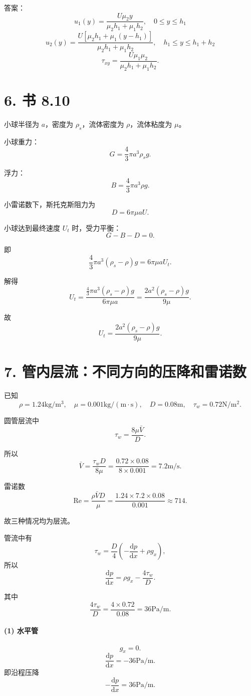 ﻿\documentclass[12pt,a4paper]{ctexart}
\newcommand{\Rey}{\mathrm{Re}}
\newcommand{\dd}{\mathrm d}
\begin{document}
答案：
\[
\boxed{
u_1(y)=
\frac{U\mu_2 y}{\mu_2h_1+\mu_1h_2},
\quad 0\le y\le h_1
}
\]
\[
\boxed{
u_2(y)=
\frac{U\left[\mu_2h_1+\mu_1(y-h_1)\right]}
{\mu_2h_1+\mu_1h_2},
\quad h_1\le y\le h_1+h_2
}
\]
\[
\boxed{
\tau_{xy}=
\frac{U\mu_1\mu_2}{\mu_2h_1+\mu_1h_2}
}.
\]

\section*{6. 书 8.10}

小球半径为 \(a\)，密度为 \(\rho_s\)，流体密度为 \(\rho\)，流体粘度为 \(\mu\)。

小球重力：
\[
G=\frac43\pi a^3\rho_s g.
\]

浮力：
\[
B=\frac43\pi a^3\rho g.
\]

小雷诺数下，斯托克斯阻力为
\[
D=6\pi\mu aU.
\]

小球达到最终速度 \(U_t\) 时，受力平衡：
\[
G-B-D=0.
\]

即
\[
\frac43\pi a^3(\rho_s-\rho)g
=6\pi\mu aU_t.
\]

解得
\[
U_t=
\frac{\frac43\pi a^3(\rho_s-\rho)g}{6\pi\mu a}
=
\frac{2a^2(\rho_s-\rho)g}{9\mu}.
\]

故
\[
\boxed{
U_t=\frac{2a^2(\rho_s-\rho)g}{9\mu}
}.
\]

\section*{7. 管内层流：不同方向的压降和雷诺数}

已知
\[
\rho=1.24\mathrm{kg/m^3},\quad
\mu=0.001\mathrm{kg/(m\cdot s)},\quad
D=0.08\mathrm m,\quad
\tau_w=0.72\mathrm{N/m^2}.
\]

圆管层流中
\[
\tau_w=\frac{8\mu \bar V}{D}.
\]

所以
\[
\bar V=\frac{\tau_wD}{8\mu}
=\frac{0.72\times0.08}{8\times0.001}
=7.2\mathrm{m/s}.
\]

雷诺数
\[
\Rey=\frac{\rho \bar VD}{\mu}
=\frac{1.24\times7.2\times0.08}{0.001}
\approx714.
\]

故三种情况均为层流。

管流中有
\[
\tau_w=\frac{D}{4}\left(-\frac{\dd p}{\dd x}+\rho g_x\right),
\]
所以
\[
\frac{\dd p}{\dd x}
=\rho g_x-\frac{4\tau_w}{D}.
\]

其中
\[
\frac{4\tau_w}{D}
=\frac{4\times0.72}{0.08}
=36\mathrm{Pa/m}.
\]

\paragraph{(1) 水平管}
\[
g_x=0.
\]
\[
\frac{\dd p}{\dd x}=-36\mathrm{Pa/m}.
\]
即沿程压降
\[
-\frac{\dd p}{\dd x}=36\mathrm{Pa/m}.
\]
\end{document}
